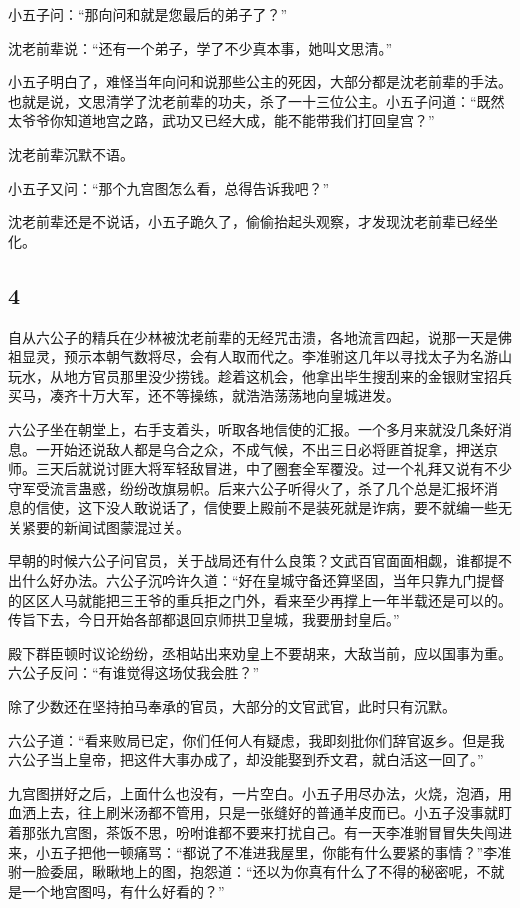 小五子问：“那向问和就是您最后的弟子了？”

沈老前辈说：“还有一个弟子，学了不少真本事，她叫文思清。”

小五子明白了，难怪当年向问和说那些公主的死因，大部分都是沈老前辈的手法。也就是说，文思清学了沈老前辈的功夫，杀了一十三位公主。小五子问道：“既然太爷爷你知道地宫之路，武功又已经大成，能不能带我们打回皇宫？”

沈老前辈沉默不语。

小五子又问：“那个九宫图怎么看，总得告诉我吧？”

沈老前辈还是不说话，小五子跪久了，偷偷抬起头观察，才发现沈老前辈已经坐化。
\newline

{\centering\subsection{4}}

自从六公子的精兵在少林被沈老前辈的无经咒击溃，各地流言四起，说那一天是佛祖显灵，预示本朝气数将尽，会有人取而代之。李准驸这几年以寻找太子为名游山玩水，从地方官员那里没少捞钱。趁着这机会，他拿出毕生搜刮来的金银财宝招兵买马，凑齐十万大军，还不等操练，就浩浩荡荡地向皇城进发。

六公子坐在朝堂上，右手支着头，听取各地信使的汇报。一个多月来就没几条好消息。一开始还说敌人都是乌合之众，不成气候，不出三日必将匪首捉拿，押送京师。三天后就说讨匪大将军轻敌冒进，中了圈套全军覆没。过一个礼拜又说有不少守军受流言蛊惑，纷纷改旗易帜。后来六公子听得火了，杀了几个总是汇报坏消
息的信使，这下没人敢说话了，信使要上殿前不是装死就是诈病，要不就编一些无关紧要的新闻试图蒙混过关。

早朝的时候六公子问官员，关于战局还有什么良策？文武百官面面相觑，谁都提不出什么好办法。六公子沉吟许久道：“好在皇城守备还算坚固，当年只靠九门提督的区区人马就能把三王爷的重兵拒之门外，看来至少再撑上一年半载还是可以的。传旨下去，今日开始各部都退回京师拱卫皇城，我要册封皇后。”

殿下群臣顿时议论纷纷，丞相站出来劝皇上不要胡来，大敌当前，应以国事为重。六公子反问：“有谁觉得这场仗我会胜？”

除了少数还在坚持拍马奉承的官员，大部分的文官武官，此时只有沉默。

六公子道：“看来败局已定，你们任何人有疑虑，我即刻批你们辞官返乡。但是我六公子当上皇帝，把这件大事办成了，却没能娶到乔文君，就白活这一回了。”
\newline

九宫图拼好之后，上面什么也没有，一片空白。小五子用尽办法，火烧，泡酒，用血洒上去，往上刷米汤都不管用，只是一张缝好的普通羊皮而已。小五子没事就盯着那张九宫图，茶饭不思，吩咐谁都不要来打扰自己。有一天李准驸冒冒失失闯进来，小五子把他一顿痛骂：“都说了不准进我屋里，你能有什么要紧的事情？”李准驸一脸委屈，瞅瞅地上的图，抱怨道：“还以为你真有什么了不得的秘密呢，不就是一个地宫图吗，有什么好看的？”

